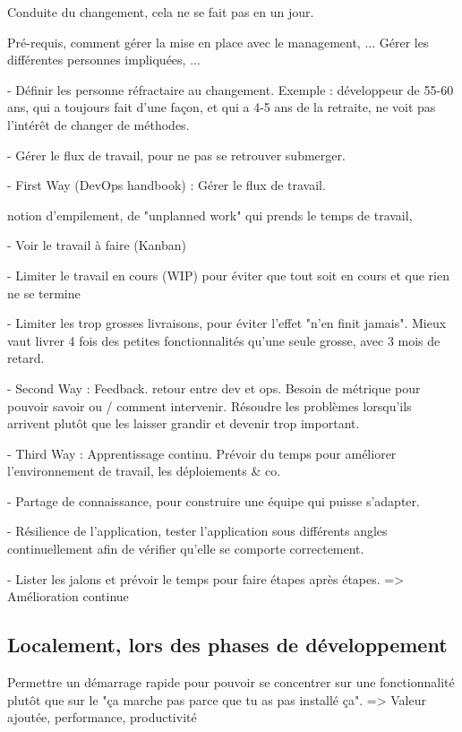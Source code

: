 Conduite du changement, cela ne se fait pas en un jour.

Pré-requis, comment gérer la mise en place avec le management, ... Gérer les différentes personnes impliquées, ...

- Définir les personne réfractaire au changement. Exemple : développeur de 55-60 ans, qui a toujours fait d'une façon, et qui a 4-5 ans de la retraite, ne voit pas l'intérêt de changer de méthodes.

- Gérer le flux de travail, pour ne pas se retrouver submerger.

- First Way (DevOps handbook) : Gérer le flux de travail. 

notion d'empilement, de "unplanned work" qui prends le temps de travail,

- Voir le travail à faire (Kanban)

- Limiter le travail en cours (WIP) pour éviter que tout soit en cours et que rien ne se termine

- Limiter les trop grosses livraisons, pour éviter l'effet "n'en finit jamais". Mieux vaut livrer 4 fois des petites fonctionnalités qu'une seule grosse, avec 3 mois de retard.

- Second Way : Feedback. retour entre dev et ops. Besoin de métrique pour pouvoir savoir ou / comment intervenir. Résoudre les problèmes lorsqu'ils arrivent plutôt que les laisser grandir et devenir trop important.

- Third Way : Apprentissage continu. Prévoir du temps pour améliorer l'environnement de travail, les déploiements  \& co.

- Partage de connaissance, pour construire une équipe qui puisse s'adapter.

- Résilience de l'application, tester l'application sous différents angles continuellement afin de vérifier qu'elle se comporte correctement.

- Lister les jalons et prévoir le temps pour faire étapes après étapes. => Amélioration continue

\subsection{Localement, lors des phases de développement}


Permettre un démarrage rapide pour pouvoir se concentrer sur une fonctionnalité plutôt que sur le "ça marche pas parce que tu as pas installé ça". => Valeur ajoutée, performance, productivité


